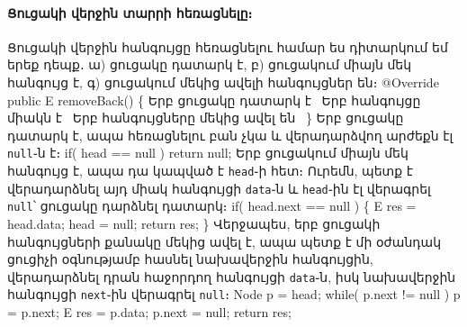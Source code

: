 \paragraph{Ցուցակի վերջին տարրի հեռացնելը։}
Ցուցակի վերջին հանգույցը հեռացնելու համար ես դիտարկում եմ 
երեք դեպք․ ա) ցուցակը դատարկ է, բ) ցուցակում միայն մեկ 
հանգույց է, գ) ցուցակում մեկից ավելի հանգույցներ են։
\nwenddocs{}\endmoddef{}
@Override
public E removeBack()
\{
  \LA{}Երբ ցուցակը դատարկ է~{\nwtagstyle{}}\RA{}
  \LA{}Երբ հանգույցը միակն է~{\nwtagstyle{}}\RA{}
  \LA{}Երբ հանգույցները մեկից ավել են~{\nwtagstyle{}}\RA{}
\}
\nwendcode{}\nwdocspar
Երբ ցուցակը դատարկ է, ապա հեռացնելու բան չկա և վերադարձվող 
արժեքն էլ \texttt{null}֊ն է։
\nwenddocs{}\endmoddef{}
if( head == null )
  return null;
\nwendcode{}\nwdocspar
Երբ ցուցակում միայն մեկ հանգույց է, ապա դա կապված է \texttt{head}֊ի 
հետ։ Ուրեմն, պետք է վերադարձնել այդ միակ հանգույցի \texttt{data}֊ն 
և \texttt{head}֊ին էլ վերագրել \texttt{null}՝ ցուցակը դարձնել դատարկ։
\nwenddocs{}\endmoddef{}
if( head.next == null ) \{
  E res = head.data;
  head = null;
  return res;
\}
\nwendcode{}\nwdocspar
Վերջապես, երբ ցուցակի հանգույցների քանակը մեկից ավել է, ապա պետք 
է մի օժանդակ ցուցիչի օգնությամբ հասնել նախավերջին հանգույցին, 
վերադարձնել դրան հաջորդող հանգույցի \texttt{data}֊ն, իսկ 
նախավերջին հանգույցի \texttt{next}֊ին վերագրել \texttt{null}։
\nwenddocs{}\endmoddef{}
Node p = head;
while( p.next != null )
  p = p.next;
E res = p.data;
p.next = null;
return res;
\nwendcode{}\nwdocspar

